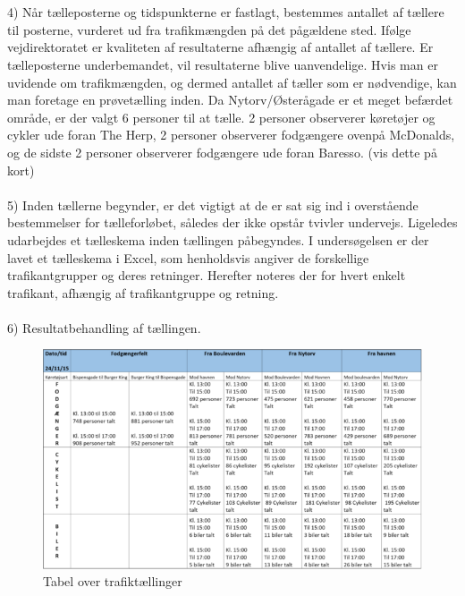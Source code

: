 ~\\\\
4) Når tælleposterne og tidspunkterne er fastlagt, bestemmes antallet af tællere til posterne, vurderet ud fra trafikmængden på det pågældene sted. Ifølge vejdirektoratet er kvaliteten af resultaterne afhængig af antallet af tællere. Er tælleposterne underbemandet, vil resultaterne blive uanvendelige. Hvis man er uvidende om trafikmængden, og dermed antallet af tæller som er nødvendige, kan man foretage en prøvetælling inden. Da Nytorv/Østerågade er et meget befærdet område, er der valgt 6 personer til at tælle. 2 personer observerer køretøjer og cykler ude foran The Herp, 2 personer observerer fodgængere ovenpå McDonalds, og de sidste 2 personer observerer fodgængere ude foran Baresso. (vis dette på kort)
~\\\\
5) Inden tællerne begynder, er det vigtigt at de er sat sig ind i overstående bestemmelser for tælleforløbet, således der ikke opstår tvivler undervejs. Ligeledes udarbejdes et tælleskema inden tællingen påbegyndes. I undersøgelsen er der lavet et tælleskema i Excel, som henholdsvis angiver de forskellige trafikantgrupper og deres retninger. Herefter noteres der for hvert enkelt trafikant, afhængig af trafikantgruppe og retning.
~\\\\
6) Resultatbehandling af tællingen.
\begin{figure}[htbp]
   \centering
   \begin{adjustbox}{max width=\textwidth}
     \includegraphics[scale=0.3]{figures/Billederogfigur/resultat.jpg}
  \end{adjustbox}
   \caption{Tabel over trafiktællinger}
   \label{fig:resultat}
 \end{figure}
